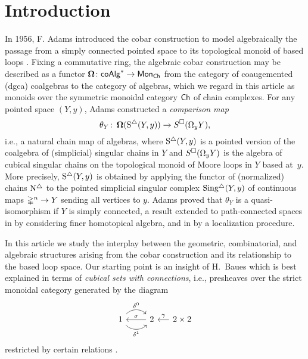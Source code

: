 
\section{Introduction}

In 1956, F. Adams introduced the cobar construction to model algebraically the passage from a simply connected pointed space to its topological monoid of based loops \cite{adams1956cobar}.
Fixing a commutative ring, the algebraic cobar construction may be described as a functor $\operatorname{\mathbf{\Omega}} \colon \mathsf{coAlg}^* \to \mathsf{Mon}_{\mathsf{Ch}}$ from the category of coaugemented (dgca) coalgebras to the category of algebras, which we regard in this article as monoids over the symmetric monoidal category $\mathsf{Ch}$ of chain complexes.
For any pointed space $(Y, y)$, Adams constructed a \textit{comparison map}
\begin{equation} \label{e:adams map}
\theta_Y \colon \operatorname{\mathbf{\Omega}}(\operatorname{S^{\triangle}}(Y, y)) \to S^{\square}(\Omega_y Y),
\end{equation}
i.e., a natural chain map of algebras, where $\operatorname{S^{\triangle}}(Y,y)$ is a pointed version of the coalgebra of (simplicial) singular chains in $Y$ and $S^{\square}(\Omega_yY)$ is the algebra of cubical singular chains on the topological monoid of Moore loops in $Y$ based at~$y$.
More precisely, $\operatorname{S^{\triangle}}(Y,y)$ is obtained by applying the functor of (normalized) chains $\operatorname{N^{\triangle}}$ to the pointed simplicial singular complex $\operatorname{Sing^{\triangle}}(Y, y)$ of continuous maps $\mathbb{\Delta}^n \to Y$ sending all vertices to $y$.
Adams proved that $\theta_Y$ is a quasi-isomorphism if $Y$ is simply connected, a result extended to path-connected spaces in \cite{rivera2018cubical} by considering finer homotopical algebra, and in \cite{hess2010cobar} by a localization procedure.

In this article we study the interplay between the geometric, combinatorial, and algebraic structures arising from the cobar construction and its relationship to the based loop space.
Our starting point is an insight of H.~Baues which is best explained in terms of \textit{cubical sets with connections}, i.e., presheaves over the 
strict monoidal category generated by the diagram
\begin{equation*}
\begin{tikzcd}
1 \arrow[r, out=45, in=135, "\delta^0"] \arrow[r, out=-45, in=-135, "\delta^1"'] & 2 \arrow[l, "\sigma"'] &[-10pt] \arrow[l, "\gamma"'] 2 \times 2
\end{tikzcd}
\end{equation*}
restricted by certain relations \cite{brown1981cubes, grandis2003cubical}.

